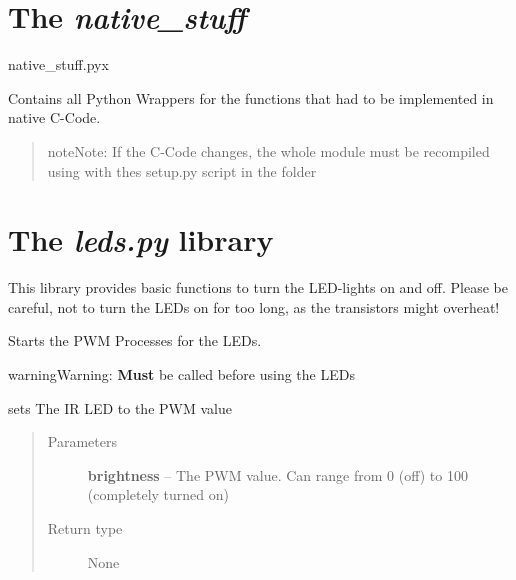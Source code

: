\documentclass[a4paper,10pt,openany,oneside]{sphinxmanual}
\begin{document}
\section{The \emph{native\_stuff}}
\label{index:the-native-stuff}\label{index:module-scripts.native_stuff}
native\_stuff.pyx

Contains all Python Wrappers for the functions that had to be implemented in
native C-Code.
\begin{quote}

\begin{notice}{note}{Note:}
If the C-Code changes, the whole module must be recompiled using
 with thes setup.py script in the
 folder
\end{notice}
\end{quote}


\section{The \emph{leds.py} library}
\label{index:the-leds-py-library}\label{index:module-scripts.leds}
This library provides basic functions to turn the
LED-lights on and off. Please be careful, not to turn the LEDs on for too
long, as the transistors might overheat!

\begin{fulllineitems}
\label{index:scripts.leds.initLEDs}
Starts the PWM Processes for the LEDs.

\begin{notice}{warning}{Warning:}
\textbf{Must} be called before using the LEDs
\end{notice}

\end{fulllineitems}


\begin{fulllineitems}
\label{index:scripts.leds.setIR}
sets The IR LED to the PWM value 
\begin{quote}\begin{description}
\item[{Parameters}] \leavevmode
\textbf{brightness} -- The PWM value. Can range from 0 (off) to 100 (completely turned on)

\item[{Return type}] \leavevmode
None

\end{description}\end{quote}

\end{fulllineitems}
\end{document}
